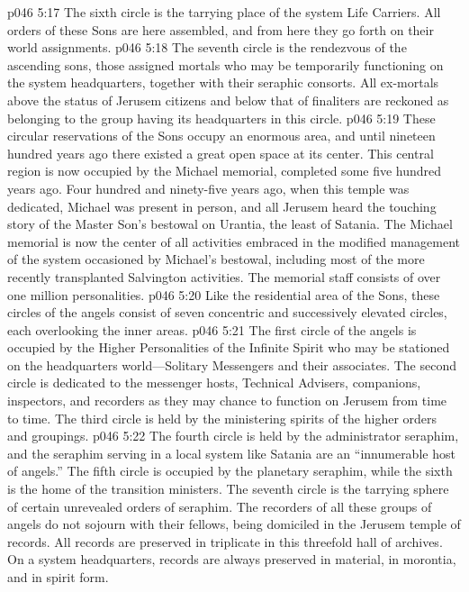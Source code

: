 \vs p046 5:17 The sixth circle is the tarrying place of the system Life Carriers. All orders of these Sons are here assembled, and from here they go forth on their world assignments.
\vs p046 5:18 The seventh circle is the rendezvous of the ascending sons, those assigned mortals who may be temporarily functioning on the system headquarters, together with their seraphic consorts. All ex\hyp{}mortals above the status of Jerusem citizens and below that of finaliters are reckoned as belonging to the group having its headquarters in this circle.
\vs p046 5:19 These circular reservations of the Sons occupy an enormous area, and until nineteen hundred years ago there existed a great open space at its center. This central region is now occupied by the Michael memorial, completed some five hundred years ago. Four hundred and ninety\hyp{}five years ago, when this temple was dedicated, Michael was present in person, and all Jerusem heard the touching story of the Master Son’s bestowal on Urantia, the least of Satania. The Michael memorial is now the center of all activities embraced in the modified management of the system occasioned by Michael’s bestowal, including most of the more recently transplanted Salvington activities. The memorial staff consists of over one million personalities.
\pc \vs p046 5:20 \bibnobreakspace {} Like the residential area of the Sons, these circles of the angels consist of seven concentric and successively elevated circles, each overlooking the inner areas.
\pc \vs p046 5:21 The first circle of the angels is occupied by the Higher Personalities of the Infinite Spirit who may be stationed on the headquarters world---Solitary Messengers and their associates. The second circle is dedicated to the messenger hosts, Technical Advisers, companions, inspectors, and recorders as they may chance to function on Jerusem from time to time. The third circle is held by the ministering spirits of the higher orders and groupings.
\vs p046 5:22 The fourth circle is held by the administrator seraphim, and the seraphim serving in a local system like Satania are an “innumerable host of angels.” The fifth circle is occupied by the planetary seraphim, while the sixth is the home of the transition ministers. The seventh circle is the tarrying sphere of certain unrevealed orders of seraphim. The recorders of all these groups of angels do not sojourn with their fellows, being domiciled in the Jerusem temple of records. All records are preserved in triplicate in this threefold hall of archives. On a system headquarters, records are always preserved in material, in morontia, and in spirit form.
